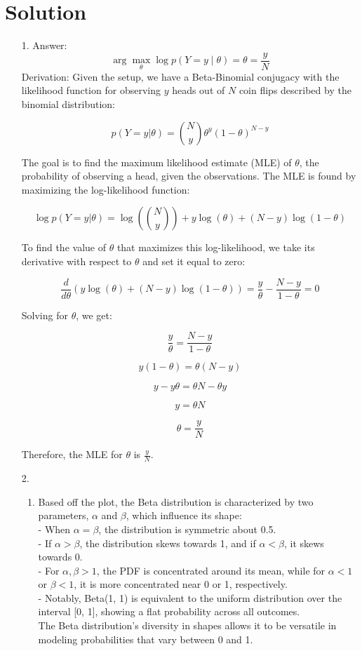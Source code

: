 \documentclass[submit]{harvardml}
\newenvironment{answer}
  {\section*{Solution}}
{}
\begin{document}
\begin{answer}
  \begin{enumerate}
    \item[1.]
      Answer: 
      \[
        \arg \max_{\theta} \log p(Y = y \mid \theta) = \theta = \frac{y}{N} 
      \]
      Derivation:  Given the setup, we have a Beta-Binomial conjugacy with the likelihood function for observing $y$ heads out of $N$ coin flips described by the binomial distribution:

\[ p(Y = y | \theta) = \binom{N}{y} \theta^y (1 - \theta)^{N-y} \]

The goal is to find the maximum likelihood estimate (MLE) of $\theta$, the probability of observing a head, given the observations. The MLE is found by maximizing the log-likelihood function:

\[ \log p(Y = y | \theta) = \log \left( \binom{N}{y} \right) + y \log(\theta) + (N - y) \log(1 - \theta) \]

To find the value of $\theta$ that maximizes this log-likelihood, we take its derivative with respect to $\theta$ and set it equal to zero:

\[ \frac{d}{d\theta} \left( y \log(\theta) + (N - y) \log(1 - \theta) \right) = \frac{y}{\theta} - \frac{N - y}{1 - \theta} = 0 \]

Solving for $\theta$, we get:

\[ \frac{y}{\theta} = \frac{N - y}{1 - \theta} \]

\[ y(1 - \theta) = \theta(N - y) \]

\[ y - y\theta = \theta N - \theta y \]

\[ y = \theta N \]

\[ \theta = \frac{y}{N} \]

Therefore, the MLE for $\theta$ is $\frac{y}{N}$.


    \item[2.]
      \begin{enumerate}
        \item Based off the plot, the Beta distribution is characterized by two parameters, \(\alpha\) and \(\beta\), which influence its shape: \\
- When \(\alpha = \beta\), the distribution is symmetric about 0.5.\\
- If \(\alpha > \beta\), the distribution skews towards 1, and if \(\alpha < \beta\), it skews towards 0. \\
- For \(\alpha, \beta > 1\), the PDF is concentrated around its mean, while for \(\alpha < 1\) or \(\beta < 1\), it is more concentrated near 0 or 1, respectively.\\
- Notably, Beta(1, 1) is equivalent to the uniform distribution over the interval [0, 1], showing a flat probability across all outcomes.\\
The Beta distribution's diversity in shapes allows it to be versatile in modeling probabilities that vary between 0 and 1.



\end{enumerate}
\end{enumerate}
\end{answer}
\end{document}
